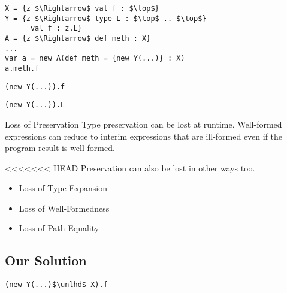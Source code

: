 \documentclass[dvipsnames]{beamer}
\begin{document}
\begin{lrbox}{\tmExPreservationA}
\begin{lstlisting}[mathescape, style=customlang]
X = {z $\Rightarrow$ val f : $\top$}
Y = {z $\Rightarrow$ type L : $\top$ .. $\top$}
	  val f : z.L}
A = {z $\Rightarrow$ def meth : X}
...
var a = new A(def meth = {new Y(...)} : X)
a.meth.f
\end{lstlisting}
\end{lrbox}

\begin{lrbox}{\tmExPreservationB}
\begin{lstlisting}[mathescape, style=customlang]
(new Y(...)).f
\end{lstlisting}
\end{lrbox}

\begin{lrbox}{\tmExPreservationC}
\begin{lstlisting}[mathescape, style=customlang]
(new Y(...)).L
\end{lstlisting}
\end{lrbox}

\begin{frame}{Loss of Preservation}
Type preservation can be lost at runtime. Well-formed expressions can reduce to interim expressions that are ill-formed even if the program result is well-formed.
\begin{block}{ }
\usebox{\tmExPreservationA}
\end{block}
<<<<<<< HEAD
Preservation can also be lost in other ways too.
\begin{itemize}
\item
Loss of Type Expansion
\item
Loss of Well-Formedness
\item
Loss of Path Equality
\end{itemize}
\end{frame}

\subsection{Our Solution}

\begin{lrbox}{\tmExPreservationD}
\begin{lstlisting}[mathescape, style=customlang]
(new Y(...)$\unlhd$ X).f
\end{lstlisting}
\end{lrbox}
\end{document}
